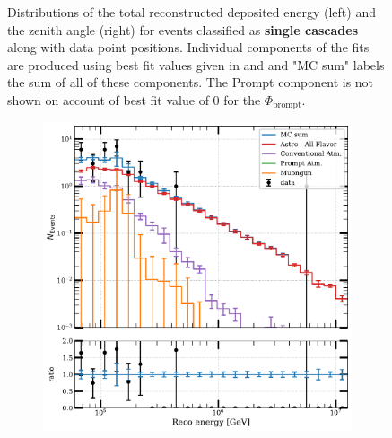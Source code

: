 \begin{figure}[h]
\begin{subfigure}[h]{0.7\textwidth}
    \end{subfigure}%
    \caption[Data/MC agreement for HESE-12 Cascades]{Distributions of the total reconstructed deposited energy (left) and the zenith angle (right) for events classified as \textbf{single cascades} along with data point positions. Individual components of the fits are produced using best fit values given in  and  and "MC sum" labels the sum of all of these components. The Prompt component is not shown on account of best fit value of 0 for the $\Phi_{\mathrm{prompt}}$.}
\end{figure}

\begin{figure}[h!]
    \begin{subfigure}[h]{0.7\textwidth}
        \includegraphics{./figures/results/DataMC_IC86_pass2_SnowStorm_v2_Bfr_Tracks_energy.pdf}
    \end{subfigure}
    \hfill
    \begin{subfigure}[h]{0.7\textwidth}

\end{subfigure}
\end{figure}
